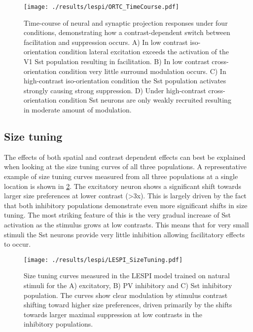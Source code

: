 \begin{figure}
	\centering
        \texttt{[image: ./results/lespi/ORTC\_TimeCourse.pdf]}
	\caption[Time-course of neural and synaptic projection responses
      under four conditions, demonstrating how a contrast-dependent
      switch between facilitation and suppression occurs]{Time-course
      of neural and synaptic projection responses under four
      conditions, demonstrating how a contrast-dependent switch
      between facilitation and suppression occurs. A) In low contrast
      iso-orientation condition lateral excitation exceeds the
      activation of the V1 Sst population resulting in
      facilitation. B) In low contrast cross-orientation condition
      very little surround modulation occurs. C) In high-contrast
      iso-orientation condition the Sst population activates strongly
      causing strong suppression. D) Under high-contrast
      cross-orientation condition Sst neurons are only weakly
      recruited resulting in moderate amount of modulation.}
	\label{ORTC_TimeCourse}
\end{figure}

\subsection{Size tuning}

The effects of both spatial and contrast dependent effects can best be
explained when looking at the size tuning curves of all three
populations. A representative example of size tuning curves measured
from all three populations at a single location is shown in
\ref{LESPI_SizeTuning}. The excitatory neuron shows a significant
shift towards larger size preferences at lower contrast (>3x). This is
largely driven by the fact that both inhibitory populations
demonstrate even more significant shifts in size tuning. The most
striking feature of this is the very gradual increase of Sst
activation as the stimulus grows at low contrasts. This means that for
very small stimuli the Sst neurons provide very little inhibition
allowing facilitatory effects to occur.

\begin{figure}
	\centering
        \texttt{[image: ./results/lespi/LESPI\_SizeTuning.pdf]}
	\caption[Size tuning curves of the excitatory, PV and Sst
      population at various contrasts.]{Size tuning curves measured in
      the LESPI model trained on natural stimuli for the A)
      excitatory, B) PV inhibitory and C) Sst inhibitory
      population. The curves show clear modulation by stimulus
      contrast shifting toward higher size preferences, driven
      primarily by the shifts towards larger maximal suppression at
      low contrasts in the inhibitory populations.}
	\label{LESPI_SizeTuning}
\end{figure}


